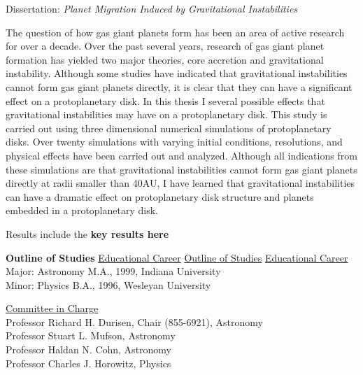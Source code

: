 \documentclass[letterpaper,11pt]{article}
\begin{document}
\begin{spacing}{1.0}
\vspace{0.3cm}
\noindent
Dissertation: {\it Planet Migration Induced by Gravitational Instabilities}
\vspace{0.3cm}

\noindent
The question of how gas giant planets form has been an area of active research for over a decade. Over the past several years, research of gas giant planet formation has yielded two major theories, core accretion and gravitational instability. Although some studies have indicated that gravitational instabilities cannot form gas giant planets directly, it is clear that they can have a significant effect on a protoplanetary disk. In this thesis I several possible effects that gravitational instabilities may have on a protoplanetary disk. This study is carried out using three dimensional numerical simulations of protoplanetary disks. Over twenty simulations with varying initial conditions, resolutions, and physical effects have been carried out and analyzed. Although all indications from these simulations are that gravitational instabilities cannot form gas giant planets directly at radii smaller than 40AU, I have learned that gravitational instabilities can have a dramatic effect on protoplanetary disk structure and planets embedded in a protoplanetary disk. 

Results include the {\bf key results here}

\vspace{0.3cm}

\begin{tabbing}
\textbf{Outline of Studies} \hspace{0.30\linewidth}
\= \underline{Educational Career} \kill
\underline{Outline of Studies} \> \underline{Educational Career} \\
Major:  Astronomy  \> M.A., 1999, Indiana University \\
Minor:  Physics    \> B.A., 1996, Wesleyan University
\end{tabbing}


\vspace{0.3cm}

\begin{center}
\underline{Committee in Charge} \\
\vspace{12pt}
Professor Richard H. Durisen, Chair (855-6921), Astronomy \\
Professor Stuart L. Mufson, Astronomy \\
Professor Haldan N. Cohn, Astronomy \\
Professor Charles J. Horowitz, Physics
\end{center}


\end{spacing}
\end{document}
